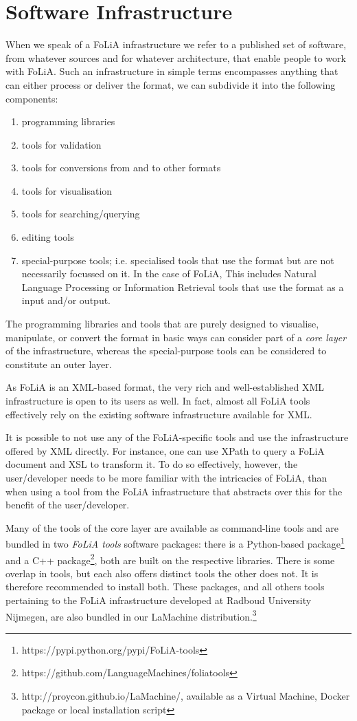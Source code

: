 \section{Software Infrastructure}

When we speak of a FoLiA infrastructure we refer to a published set of
software, from whatever sources and for whatever architecture, that enable
people to work with FoLiA.  Such an infrastructure in simple
terms encompasses anything that can either process or deliver the format, we
can subdivide it into the following components:

\begin{enumerate}
\item programming libraries
\item tools for validation
\item tools for conversions from and to other formats
\item tools for visualisation
\item tools for searching/querying
\item editing tools
\item special-purpose tools; i.e. specialised tools that use the format but are
    not necessarily focussed on it. In the case of FoLiA, This includes Natural
    Language Processing or Information Retrieval tools that use the format as a
    input and/or output.
\end{enumerate}

The programming libraries and tools that are purely designed to visualise,
manipulate, or convert the format in basic ways can consider part of a
\emph{core layer} of the infrastructure, whereas the special-purpose tools can
be considered to constitute an outer layer.

As FoLiA is an XML-based format, the very rich and well-established XML
infrastructure is open to its users as well. In fact, almost all FoLiA tools
effectively rely on the existing software infrastructure available for XML. 

It is possible to not use any of the FoLiA-specific tools and use the
infrastructure offered by XML directly. For instance, one can use XPath to
query a FoLiA document and XSL to transform it. To do so effectively, however,
the user/developer needs to be more familiar with the intricacies of FoLiA,
than when using a tool from the FoLiA infrastructure that abstracts over this
for the benefit of the user/developer.

Many of the tools of the core layer are available as command-line tools and are
bundled in two \emph{FoLiA tools} software packages: there is a Python-based
package\footnote{https://pypi.python.org/pypi/FoLiA-tools} and a C++
package\footnote{https://github.com/LanguageMachines/foliatools}, both are
built on the respective libraries.  There is some overlap in tools, but each
also offers distinct tools the other does not. It is therefore recommended to
install both. These packages, and all others tools pertaining to the FoLiA
infrastructure developed at Radboud University Nijmegen, are also bundled in our
LaMachine distribution.\footnote{http://proycon.github.io/LaMachine/, available
as a Virtual Machine, Docker package or local installation script}

